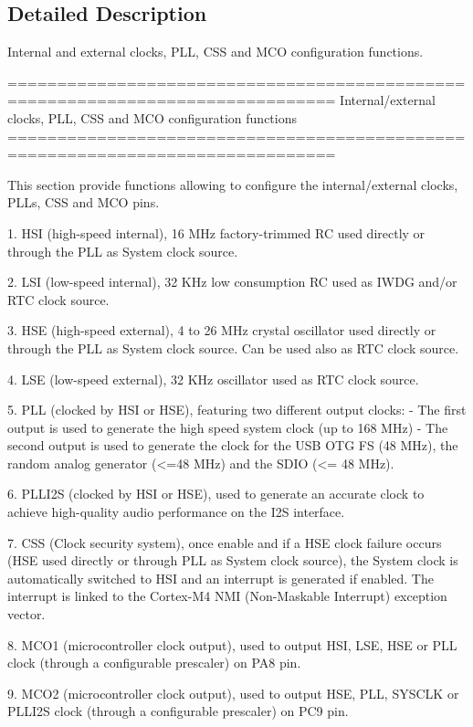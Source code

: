 \subsection{Detailed Description}
Internal and external clocks, P\-L\-L, C\-S\-S and M\-C\-O configuration functions. \begin{DoxyVerb} ===============================================================================
      Internal/external clocks, PLL, CSS and MCO configuration functions
 ===============================================================================  

  This section provide functions allowing to configure the internal/external clocks,
  PLLs, CSS and MCO pins.
  
  1. HSI (high-speed internal), 16 MHz factory-trimmed RC used directly or through
     the PLL as System clock source.

  2. LSI (low-speed internal), 32 KHz low consumption RC used as IWDG and/or RTC
     clock source.

  3. HSE (high-speed external), 4 to 26 MHz crystal oscillator used directly or
     through the PLL as System clock source. Can be used also as RTC clock source.

  4. LSE (low-speed external), 32 KHz oscillator used as RTC clock source.   

  5. PLL (clocked by HSI or HSE), featuring two different output clocks:
      - The first output is used to generate the high speed system clock (up to 168 MHz)
      - The second output is used to generate the clock for the USB OTG FS (48 MHz),
        the random analog generator (<=48 MHz) and the SDIO (<= 48 MHz).

  6. PLLI2S (clocked by HSI or HSE), used to generate an accurate clock to achieve 
     high-quality audio performance on the I2S interface.
  
  7. CSS (Clock security system), once enable and if a HSE clock failure occurs 
     (HSE used directly or through PLL as System clock source), the System clock
     is automatically switched to HSI and an interrupt is generated if enabled. 
     The interrupt is linked to the Cortex-M4 NMI (Non-Maskable Interrupt) 
     exception vector.   

  8. MCO1 (microcontroller clock output), used to output HSI, LSE, HSE or PLL
     clock (through a configurable prescaler) on PA8 pin.

  9. MCO2 (microcontroller clock output), used to output HSE, PLL, SYSCLK or PLLI2S
     clock (through a configurable prescaler) on PC9 pin.\end{DoxyVerb}
 


